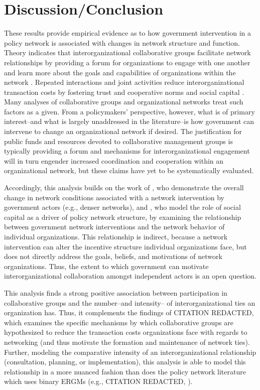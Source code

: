 \documentclass[12pt,a4paper,titlepage]{article}
\begin{document}
\section{Discussion/Conclusion}

These results provide empirical evidence as to how government intervention in a policy network is associated with changes in network structure and function. Theory indicates that interorganizational collaborative groups facilitate network relationships by providing a forum for organizations to engage with one another and learn more about the goals and capabilities of organizations within the network \parencite{emerson2012}. Repeated interactions and joint activities reduce interorganizational transaction costs by fostering trust and cooperative norms \parencite{ostrom2000} and social capital \parencite{putnam2000}. Many analyses of collaborative groups and organizational networks treat such factors as a given. From a policymakers’ perspective, however, what is of primary interest--and what is largely unaddressed in the literature--is how government can intervene to change an organizational network if desired. The justification for public funds and resources devoted to collaborative management groups is typically providing a forum and mechanisms for interorganizational engagement will in turn engender increased coordination and cooperation within an organizational network, but these claims have yet to be systematically evaluated.

Accordingly, this analysis builds on the work of \textcite{schneider2003}, who demonstrate the overall change in network conditions associated with a network intervention by government actors (e.g., denser networks), and \textcite{henry2011}, who model the role of social capital as a driver of policy network structure, by examining the relationship between government network interventions and the network behavior of individual organizations. This relationship is indirect, because a network intervention can alter the incentive structure individual organizations face, but does not directly address the goals, beliefs, and motivations of network organizations. Thus, the extent to which government can motivate interorganizational collaboration amongst independent actors is an open question.

This analysis finds a strong positive association between participation in collaborative groups and the number--and intensity-- of interorganizational ties an organization has. Thus, it complements the findings of CITATION REDACTED, which examines the specific mechanisms by which collaborative groups are hypothesized to reduce the transaction costs organizations face with regards to networking (and thus motivate the formation and maintenance of network ties). Further, modeling the comparative intensity of an interorganizational relationship (consultation, planning, or implementation), this analysis is able to model this relationship in a more nuanced fashion than does the policy network literature which uses binary ERGMs (e.g., CITATION REDACTED, \cite{lubell2012, gerber2013, schneider2003}).
\end{document}
